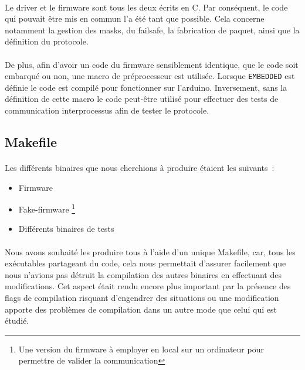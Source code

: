 \paragraph{}
Le driver et le firmware sont tous les deux écrits en C. Par conséquent, le
code qui pouvait être mis en commun l'a été tant que possible. Cela concerne
notamment la gestion des masks, du failsafe, la fabrication de paquet, ainsi
que la définition du protocole.

\paragraph{}
De plus, afin d'avoir un code du firmware sensiblement identique, que le code
soit embarqué ou non, une macro de préprocesseur est utilisée. Lorsque
\verb!EMBEDDED! est définie le code est compilé pour fonctionner sur
l'arduino. Inversement, sans la définition de cette macro le code peut-être
utilisé pour effectuer des tests de communication interprocessus afin de
tester le protocole.


\subsection{Makefile}
\paragraph{}
Les différents binaires que nous cherchions à produire étaient les suivants~:
\begin{itemize}
\item Firmware
\item Fake-firmware
      \footnote{Une version du firmware à employer en local sur un ordinateur
                pour permettre de valider la communication}
\item Différents binaires de tests
\end{itemize}

\paragraph{}
Nous avons souhaité les produire tous à l'aide d'un unique Makefile, car, tous
les exécutables partageant du code, cela nous permettait d'assurer facilement
que nous n'avions pas détruit la compilation des autres binaires en effectuant
des modifications. Cet aspect était rendu encore plus important par la présence
des flags de compilation risquant d'engendrer des situations ou une modification
apporte des problèmes de compilation dans un autre mode que celui qui est
étudié.

